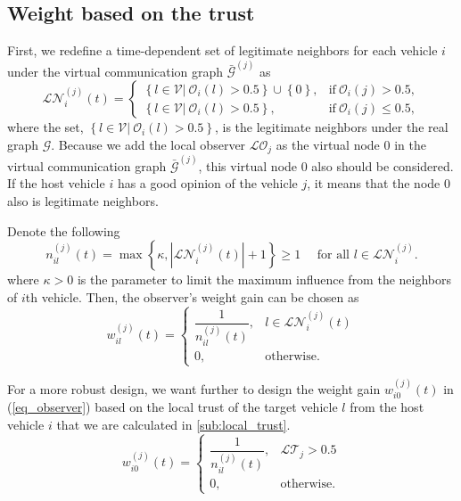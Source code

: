 \documentclass[letterpaper, 10pt, conference]{ieeeconf}  %
\def\eqref#1{(\ref{#1})}
\def\V{\mathcal{V}} %
\def\G{\mathcal{G}} %
\def\LO{\mathcal{LO}} %
\def\LT{\mathcal{LT}} %
\def\O{\mathcal{O}} %
\begin{document}
\subsection{Weight based on the trust}
First, we redefine a time-dependent set of legitimate neighbors for each vehicle $i$ under the virtual communication graph $\bar{\G}^{{(j)}}$ as
\begin{equation}
\mathcal{LN}_i^{(j)}(t)= 
\begin{cases}
    \left\{l \in \V| \  \O_{i}(l) > 0.5 \right\} \cup \left\{0 \right\},  & \text{if}\  \O_{i}(j)>0.5, \\
    \left\{l \in \V| \  \O_{i}(l) > 0.5 \right\}, & \text{if}\  \O_{i}(j) \leq 0.5,
\end{cases}
\end{equation}
where the set, $\left\{l \in \V| \  \O_{i}(l) > 0.5 \right\}$, is the  legitimate neighbors under the real graph $\G$. Because we add the local observer $\LO_{j}$ as the virtual node $0$ in the virtual communication graph $\bar{\G}^{{(j)}}$,  this virtual node $0$ also should be considered. If the host vehicle $i$ has a good opinion of the vehicle $j$, it means that the node $0$ also is legitimate neighbors.  

Denote the following 
\begin{equation}\label{new_setneibor}
n_{il}^{(j)}(t)=\max \left\{\kappa,\left|\mathcal{LN}_i^{(j)}(t)\right|+1\right\} \geq 1 \quad \text { for all } l \in \mathcal{LN}_i^{(j)}.
\end{equation}
where $\kappa >0$ is the parameter to limit the maximum influence from the neighbors of $i$th vehicle. 
Then, the observer's weight gain can be chosen as
\begin{equation}\label{design_gain}
    w_{il}^{(j)}(t) = \begin{cases}
        \dfrac{1}{n_{il}^{(j)}(t)}, & l \in \mathcal{LN}_i^{(j)}(t)\\
        0 ,& \text{otherwise}.
    \end{cases}
\end{equation}

For a more robust design, we want further to design the weight gain $w_{i0}^{(j)}(t)$ in \eqref{eq_observer} based on the local trust of the target vehicle $l$ from the host vehicle $i$ that we are calculated in \ref{sub:local_trust}.
\begin{equation}\label{redesign_gain_virtual}
    w_{i0}^{(j)}(t) = \begin{cases}
        \dfrac{1}{n_{il}^{(j)}(t)}, & \LT_j > 0.5\\
        0 ,& \text{otherwise}.
    \end{cases}
\end{equation}
\end{document}
